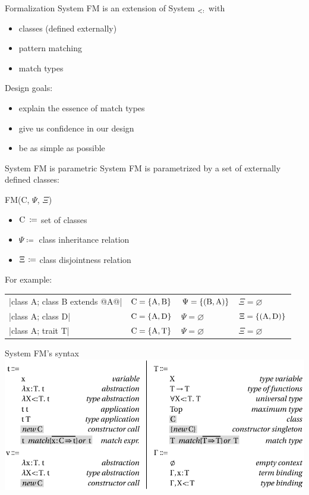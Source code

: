 \documentclass[10pt]{beamer}
\newenvironment{slide}[2][]
  {\begin{frame}[fragile,environment=slide,#1]{#2}}
  {\end{frame}}
\def\A{\normalfont\text{A}}
\def\B{\normalfont\text{B}}
\def\C{\normalfont\text{C}}
\def\D{\normalfont\text{D}}
\def\T{\normalfont\text{T}}
\def\<:{\allowbreak\operatorname{\normalfont\text{<}:}\allowbreak}
\def\Fsub{\normalfont{F}\ensuremath{_{\<:}}\xspace}
\newcommand{\tp}[1]{\color{typeColor}#1}
\begin{document}
\begin{slide}{Formalization}
System FM is an extension of System \Fsub with
\begin{itemize}
  \item classes (defined externally)
  \item pattern matching
  \item match types
\end{itemize}
\pause
Design goals:
\begin{itemize}
  \item explain the essence of match types
  \item give us confidence in our design
  \item be as simple as possible
\end{itemize}
\end{slide}

\begin{slide}{System FM is parametric}
System FM is parametrized by a set of externally defined classes:

FM(C, $\Psi$, $\Xi$)
\begin{itemize}
  \item $\C \hspace{2.3pt} \coloneqq$ set of classes
  \item $\Psi \coloneqq$ class inheritance relation
  \item $\Xi \hspace{1.1pt} \coloneqq$ class disjointness relation
\end{itemize}
\pause
For example:

\begin{tabular}{@{}llll@{}}
|class A; class B extends @\tp{A}@| &$\C = \{\A, \B\}$ & $\Psi = \{(\B, \A)\}$ & $\Xi = \varnothing$\\
|class A; class D| &$\C = \{\A, \D\}$ & $\Psi = \varnothing$  & $\Xi = \{(\A, \D)\}$\\
|class A; trait T| &$\C = \{\A, \T\}$ & $\Psi = \varnothing$  & $\Xi = \varnothing$\\
\end{tabular}
\end{slide}

\begin{slide}{System FM's syntax}
\includegraphics[width=\textwidth]{figures/FMSyntax.pdf}
\end{slide}
\end{document}
